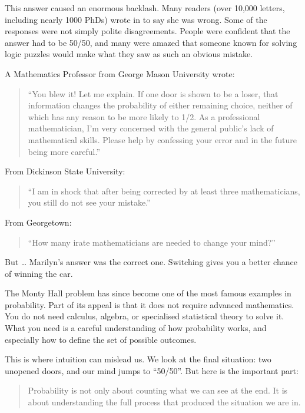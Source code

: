 \documentclass[
  letterpaper,
  DIV=11,
  numbers=noendperiod]{scrreprt}
\begin{document}
This answer caused an enormous backlash. Many readers (over 10,000
letters, including nearly 1000 PhDs) wrote in to say she was wrong. Some
of the responses were not simply polite disagreements. People were
confident that the answer had to be 50/50, and many were amazed that
someone known for solving logic puzzles would make what they saw as such
an obvious mistake.

A Mathematics Professor from George Mason University wrote:

\begin{quote}
``You blew it! Let me explain. If one door is shown to be a loser, that
information changes the probability of either remaining choice, neither
of which has any reason to be more likely to 1/2. As a professional
mathematician, I'm very concerned with the general public's lack of
mathematical skills. Please help by confessing your error and in the
future being more careful.''
\end{quote}

From Dickinson State University:

\begin{quote}
``I am in shock that after being corrected by at least three
mathematicians, you still do not see your mistake.''
\end{quote}

From Georgetown:

\begin{quote}
``How many irate mathematicians are needed to change your mind?''
\end{quote}

But \ldots{} Marilyn's answer was the correct one. Switching gives you a
better chance of winning the car.

The Monty Hall problem has since become one of the most famous examples
in probability. Part of its appeal is that it does not require advanced
mathematics. You do not need calculus, algebra, or specialised
statistical theory to solve it. What you need is a careful understanding
of how probability works, and especially how to define the set of
possible outcomes.

This is where intuition can mislead us. We look at the final situation:
two unopened doors, and our mind jumps to ``50/50''. But here is the
important part:

\begin{quote}
Probability is not only about counting what we can see at the end. It is
about understanding the full process that produced the situation we are
in.
\end{quote}
\end{document}

